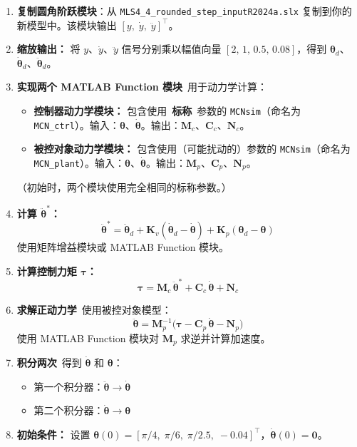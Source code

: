 \documentclass[12pt,a4paper]{ctexart}
\begin{document}
\begin{stepbox}
\begin{enumerate}[leftmargin=*, label=\textbf{步骤 \arabic*}., ref=步骤 \arabic*]
  \item \textbf{复制圆角阶跃模块}：从 \texttt{MLS4\_4\_rounded\_step\_inputR2024a.slx} 复制到你的新模型中。该模块输出 $[y,\;\dot{y},\;\ddot{y}]^\top$。
  \item \textbf{缩放输出：} 将 $y$、$\dot{y}$、$\ddot{y}$ 信号分别乘以幅值向量 $[2,\,1,\,0.5,\,0.08]$，得到 $\bm{\theta}_d$、$\dot{\bm{\theta}}_d$、$\ddot{\bm{\theta}}_d$。

  \item \textbf{实现两个 MATLAB Function 模块}\ 用于动力学计算：
  \begin{itemize}
    \item \textbf{控制器动力学模块：} 包含使用\ \textbf{标称}\ 参数的 \texttt{MCNsim}（命名为 \texttt{MCN\_ctrl}）。输入：$\bm{\theta}$、$\dot{\bm{\theta}}$。输出：$\mathbf{M}_c$、$\mathbf{C}_c$、$\mathbf{N}_c$。
    \item \textbf{被控对象动力学模块：} 包含使用（可能扰动的）参数的 \texttt{MCNsim}（命名为 \texttt{MCN\_plant}）。输入：$\bm{\theta}$、$\dot{\bm{\theta}}$。输出：$\mathbf{M}_p$、$\mathbf{C}_p$、$\mathbf{N}_p$。
  \end{itemize}
  （初始时，两个模块使用完全相同的标称参数。）

  \item \textbf{计算 $\ddot{\bm{\theta}}^*$：}
  \[
  \ddot{\bm{\theta}}^* = \ddot{\bm{\theta}}_d + \mathbf{K}_v(\dot{\bm{\theta}}_d - \dot{\bm{\theta}}) + \mathbf{K}_p(\bm{\theta}_d - \bm{\theta})
  \]
  使用矩阵增益模块或 MATLAB Function 模块。

  \item \textbf{计算控制力矩 $\bm{\tau}$：}
  \[
  \bm{\tau} = \mathbf{M}_c\,\ddot{\bm{\theta}}^* + \mathbf{C}_c\,\dot{\bm{\theta}} + \mathbf{N}_c
  \]

  \item \textbf{求解正动力学}\ 使用被控对象模型：
  \[
  \ddot{\bm{\theta}} = \mathbf{M}_p^{-1}\bigl(\bm{\tau} - \mathbf{C}_p\,\dot{\bm{\theta}} - \mathbf{N}_p\bigr)
  \]
  使用 MATLAB Function 模块对 $\mathbf{M}_p$ 求逆并计算加速度。

  \item \textbf{积分两次}\ 得到 $\dot{\bm{\theta}}$ 和 $\bm{\theta}$：
  \begin{itemize}
    \item 第一个积分器：$\ddot{\bm{\theta}} \to \dot{\bm{\theta}}$
    \item 第二个积分器：$\dot{\bm{\theta}} \to \bm{\theta}$
  \end{itemize}

  \item \textbf{初始条件：} 设置 $\bm{\theta}(0) = [\pi/4,\;\pi/6,\;\pi/2.5,\;-0.04]^\top$，$\dot{\bm{\theta}}(0)=\mathbf{0}$。
\end{enumerate}
\end{stepbox}
\end{document}
